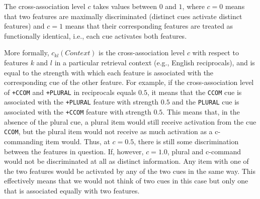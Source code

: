 \documentclass{cambridge7A}\usepackage[]{graphicx}\usepackage[]{color}
\newcommand{\actrcue}[1]{\texttt{\uppercase{#1}}}
\newcommand{\match}[1]{\texttt{+\uppercase{#1}}}
\begin{document}
The cross-association level $c$ takes values between $0$ and $1$, where $c = 0$ means that two features are maximally discriminated (distinct cues activate distinct features) and $c = 1$ means that their corresponding features are treated as functionally identical, i.e., each cue activates both features.

More formally, $c_{kl}(Context)$ is the cross-association level $c$ with respect to features $k$ and $l$ in a particular retrieval context (e.g., English reciprocals), and is equal to the strength with which each feature is associated with the corresponding cue of the other feature. 
For example, if the cross-association level of \match{ccom} and \match{plural} in reciprocals equals $0.5$, it means that the \actrcue{ccom} cue is associated with the \match{plural} feature with strength $0.5$ and the \actrcue{plural} cue is associated with the \match{ccom} feature with strength $0.5$. 
This means that, in the absence of the plural cue, a plural item would still receive activation from the cue \actrcue{ccom}, but the plural item would not receive as much activation as a c-commanding item would.
Thus, at $c=0.5$, there is still some discrimination between the features in question. 
If, however, $c=1.0$, plural and c-command would not be discriminated at all as distinct information. Any item with one of the two features would be activated by any of the two cues in the same way. 
This effectively means that we would not think of two cues in this case but only one that is associated equally with two features.
\end{document}

